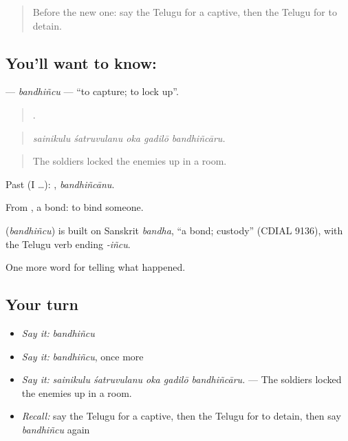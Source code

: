 \label{lesson:TE-C351-bandhincu}



\begin{quote}
Before the new one: say the Telugu for a captive, then the Telugu for to detain.
\end{quote}

\subsection*{You'll want to know: }
\textbf{} — \emph{bandhiñcu} — \textquotedblleft{}to capture; to lock up\textquotedblright{}.

\begin{quote}
    .
\end{quote}

\begin{quote}
\emph{sainikulu śatruvulanu oka gadilō bandhiñcāru.}
\end{quote}

\begin{quote}
The soldiers locked the enemies up in a room.
\end{quote}

Past (I …): , \emph{bandhiñcānu}.

From , a bond: to bind someone.

\begin{cousinweb}
\textbf{} (\emph{bandhiñcu}) is built on Sanskrit \emph{bandha}, \textquotedblleft{}a bond; custody\textquotedblright{} (CDIAL 9136), with the Telugu verb ending \emph{-iñcu}.
\end{cousinweb}

\begin{grammarlens}[title={What you've built}]
One more word for telling what happened.
\end{grammarlens}

\subsection*{Your turn}
\begin{itemize}
\raggedright
  \item \emph{Say it:} \emph{bandhiñcu}
  \item \emph{Say it:} \emph{bandhiñcu}, once more
  \item \emph{Say it:} \emph{sainikulu śatruvulanu oka gadilō bandhiñcāru.} — The soldiers locked the enemies up in a room.
  \item \emph{Recall:} say the Telugu for a captive, then the Telugu for to detain, then say \emph{bandhiñcu} again
\end{itemize}

